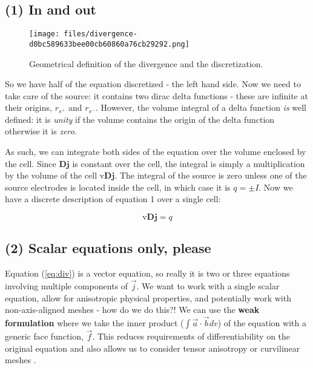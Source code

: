 \documentclass[Journal,InsideFigs,DoubleSpace,12pt,letterpaper]{ascelike-new}
\begin{document}
\subsection{(1) In and out}\label{(1) In and out}

\begin{figure}[!htbp]
\centering
\texttt{[image: files/divergence-d0bc589633bee00cb60860a76cb29292.png]}
\caption{Geometrical definition of the divergence and the discretization.}
\label{fig-div}
\end{figure}

So we have half of the equation discretized - the left hand side. Now we need to take care of the source: it contains two dirac delta functions - these are infinite at their origins, $r_{s^+}$ and $r_{s^ -}$. However, the volume integral of a delta function \textit{is} well defined: it is \textit{unity} if the volume contains the origin of the delta function otherwise it is \textit{zero}.

As such, we can integrate both sides of the equation over the volume enclosed by the cell. Since $\mathbf{D}\mathbf{j}$ is constant over the cell, the integral is simply a multiplication by the volume of the cell $\text{v} \mathbf{D} \mathbf{j}$. The integral of the source is zero unless one of the source electrodes is located inside the cell, in which case it is $q = \pm I$. Now we have a discrete description of equation 1 over a single cell:

\begin{equation}
\label{eq:div}
\text{v} \mathbf{D}\mathbf{j} = q
\end{equation}

\subsection{(2) Scalar equations only, please}\label{(2) Scalar equations only, please}

Equation (\ref{eq:div}) is a vector equation, so really it is two or three equations involving multiple components of $\vec{j}$. We want to work with a single scalar equation, allow for anisotropic physical properties, and potentially work with non-axis-aligned meshes - how do we do this?! We can use the \textbf{weak formulation} where we take the inner product ($\int \vec{a} \cdot \vec{b} dv$) of the equation with a generic face function, $\vec{f}$. This reduces requirements of differentiability on the original equation and also allows us to consider tensor anisotropy or curvilinear meshes .
\end{document}
